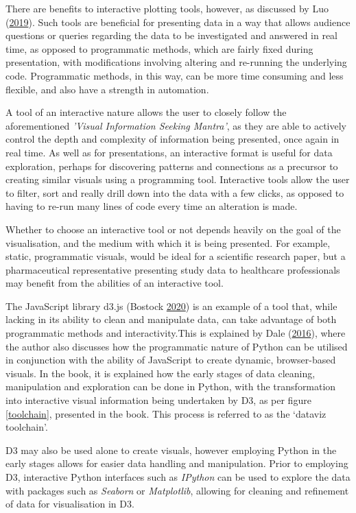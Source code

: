 \documentclass[
  11pt,
]{book}
\begin{document}
There are benefits to interactive plotting tools, however, as discussed
by Luo (\protect\hyperlink{ref-LUO2019113061}{2019}). Such tools are
beneficial for presenting data in a way that allows audience questions
or queries regarding the data to be investigated and answered in real
time, as opposed to programmatic methods, which are fairly fixed during
presentation, with modifications involving altering and re-running the
underlying code. Programmatic methods, in this way, can be more time
consuming and less flexible, and also have a strength in automation.

A tool of an interactive nature allows the user to closely follow the
aforementioned \textit{'Visual Information Seeking Mantra'}, as they are
able to actively control the depth and complexity of information being
presented, once again in real time. As well as for presentations, an
interactive format is useful for data exploration, perhaps for
discovering patterns and connections as a precursor to creating similar
visuals using a programming tool. Interactive tools allow the user to
filter, sort and really drill down into the data with a few clicks, as
opposed to having to re-run many lines of code every time an alteration
is made.

Whether to choose an interactive tool or not depends heavily on the goal
of the visualisation, and the medium with which it is being presented.
For example, static, programmatic visuals, would be ideal for a
scientific research paper, but a pharmaceutical representative
presenting study data to healthcare professionals may benefit from the
abilities of an interactive tool.

The JavaScript library d3.js (Bostock \protect\hyperlink{ref-d3}{2020})
is an example of a tool that, while lacking in its ability to clean and
manipulate data, can take advantage of both programmatic methods and
interactivity.This is explained by Dale
(\protect\hyperlink{ref-javapy}{2016}), where the author also discusses
how the programmatic nature of Python can be utilised in conjunction
with the ability of JavaScript to create dynamic, browser-based visuals.
In the book, it is explained how the early stages of data cleaning,
manipulation and exploration can be done in Python, with the
transformation into interactive visual information being undertaken by
D3, as per figure \ref{toolchain}, presented in the book. This process
is referred to as the `dataviz toolchain'.

D3 may also be used alone to create visuals, however employing Python in
the early stages allows for easier data handling and manipulation. Prior
to employing D3, interactive Python interfaces such as \textit{IPython}
can be used to explore the data with packages such as \textit{Seaborn}
or \textit{Matplotlib}, allowing for cleaning and refinement of data for
visualisation in D3.
\end{document}
